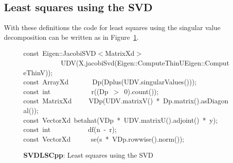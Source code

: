\documentclass[shortnames,article]{jss}
\newcommand{\hlstd}[1]{\textcolor[rgb]{0,0,0}{#1}}
\newcommand{\hlnum}[1]{\textcolor[rgb]{0,0,0}{#1}}
\newcommand{\hlopt}[1]{\textcolor[rgb]{0,0,0}{#1}}
\newcommand{\hlkwb}[1]{\textcolor[rgb]{0.13,0.54,0.13}{#1}}
\newcommand{\hlkwd}[1]{\textcolor[rgb]{0,0,0}{#1}}
\begin{document}
\subsection{Least squares using the SVD}
\label{sec:SVDls}

With these definitions the code for least squares using the singular
value decomposition can be written as in Figure~\ref{SVDLS}.
\begin{figure}[htb]
    \noindent
    \ttfamily
    \hlkwb{const\ }\hlstd{Eigen}\hlopt{::}\hlstd{JacobiSVD}\hlopt{$<$}\hlstd{MatrixXd}\hlopt{$>$}\hspace*{\fill}\\
    \hlstd{}\hlstd{\ \ \ \ \ \ \ \ \ \ \ }\hlstd{}\hlkwd{UDV}\hlstd{}\hlopt{(}\hlstd{X}\hlopt{.}\hlstd{}\hlkwd{jacobiSvd}\hlstd{}\hlopt{(}\hlstd{Eigen}\hlopt{::}\hlstd{ComputeThinU}\hlopt{\textbar }\hlstd{Eigen}\hlopt{::}\hlstd{ComputeThinV}\hlopt{));}\hspace*{\fill}\\
    \hlstd{}\hlkwb{const\ }\hlstd{ArrayXd}\hlstd{\ \ \ \ \ \ \ }\hlstd{}\hlkwd{Dp}\hlstd{}\hlopt{(}\hlstd{}\hlkwd{Dplus}\hlstd{}\hlopt{(}\hlstd{UDV}\hlopt{.}\hlstd{}\hlkwd{singularValues}\hlstd{}\hlopt{()));}\hspace*{\fill}\\
    \hlstd{}\hlkwb{const\ int}\hlstd{\ \ \ \ \ \ \ \ \ \ \ \ }\hlkwb{}\hlstd{}\hlkwd{r}\hlstd{}\hlopt{((}\hlstd{Dp\ }\hlopt{$>$\ }\hlstd{}\hlnum{0}\hlstd{}\hlopt{).}\hlstd{}\hlkwd{count}\hlstd{}\hlopt{());}\hspace*{\fill}\\
    \hlstd{}\hlkwb{const\ }\hlstd{MatrixXd}\hlstd{\ \ \ \ \ }\hlstd{}\hlkwd{VDp}\hlstd{}\hlopt{(}\hlstd{UDV}\hlopt{.}\hlstd{}\hlkwd{matrixV}\hlstd{}\hlopt{()\ {*}\ }\hlstd{Dp}\hlopt{.}\hlstd{}\hlkwd{matrix}\hlstd{}\hlopt{().}\hlstd{}\hlkwd{asDiagonal}\hlstd{}\hlopt{());}\hspace*{\fill}\\
    \hlstd{}\hlkwb{const\ }\hlstd{VectorXd\ }\hlkwd{betahat}\hlstd{}\hlopt{(}\hlstd{VDp\ }\hlopt{{*}\ }\hlstd{UDV}\hlopt{.}\hlstd{}\hlkwd{matrixU}\hlstd{}\hlopt{().}\hlstd{}\hlkwd{adjoint}\hlstd{}\hlopt{()\ {*}\ }\hlstd{y}\hlopt{);}\hspace*{\fill}\\
    \hlstd{}\hlkwb{const\ int}\hlstd{\ \ \ \ \ \ \ \ \ \ \ }\hlkwb{}\hlstd{}\hlkwd{df}\hlstd{}\hlopt{(}\hlstd{n\ }\hlopt{{-}\ }\hlstd{r}\hlopt{);}\hspace*{\fill}\\
    \hlstd{}\hlkwb{const\ }\hlstd{VectorXd}\hlstd{\ \ \ \ \ \ }\hlstd{}\hlkwd{se}\hlstd{}\hlopt{(}\hlstd{s\ }\hlopt{{*}\ }\hlstd{VDp}\hlopt{.}\hlstd{}\hlkwd{rowwise}\hlstd{}\hlopt{().}\hlstd{}\hlkwd{norm}\hlstd{}\hlopt{());}\hlstd{}\hspace*{\fill}\\
    \mbox{}
    \normalfont
    \normalsize
  \caption{\textbf{SVDLSCpp}: Least squares using the SVD}
  \label{SVDLS}
\end{figure}
\end{document}
